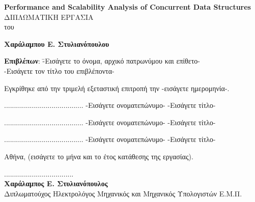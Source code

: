 \documentclass[12pt, twoside, a4paper]{report}
\begin{document}
\begin{center}
\vspace{8ex}
\large \textbf{\textlatin{Performance and Scalability Analysis of Concurrent Data Structures}} \\
\vspace{10ex}
\large
ΔΙΠΛΩΜΑΤΙΚΗ ΕΡΓΑΣΙΑ \\
\vspace{2ex}
\normalsize
του \\
\vspace{2ex}
\parbox[c]{0.4\textwidth} { \center\textbf{
Χαράλαμπου Ε. Στυλιανόπουλου }}
\vspace{10ex}
\flushleft
\begin{tabbing}
\textbf{Επιβλέπων}: \= -Εισάγετε το όνομα, αρχικό πατρωνύμου
			και επίθετο- \\
		    \> -Εισάγετε τον τίτλο του επιβλέποντα-
\end{tabbing}
\end{center}

\noindent
Εγκρίθηκε από την τριμελή εξεταστική επιτροπή την -εισάγετε ημερομηνία-.

\begin{center}
\scriptsize
\parbox[b]{0.3\textwidth} {\center
	........................................
	-Εισάγετε ονοματεπώνυμο-
	-Εισάγετε τίτλο-
}
\parbox[b]{0.3\textwidth} {\center
	........................................
	-Εισάγετε ονοματεπώνυμο-
	-Εισάγετε τίτλο-
}
\parbox[b]{0.3\textwidth} {\center
	........................................
	-Εισάγετε ονοματεπώνυμο-
	-Εισάγετε τίτλο-
}
\end{center}
\vspace{10ex}
\normalsize
\noindent
Αθήνα, (εισάγετε το μήνα και το έτος κατάθεσης της εργασίας).
\newpage
\hspace{10pt}

\vspace{30ex}
\noindent
................................... \\
\textbf{Χαράλαμπος Ε. Στυλιανόπουλος} \\
Διπλωματούχος Ηλεκτρολόγος Μηχανικός και Μηχανικός Υπολογιστών Ε.Μ.Π. \\
\vspace{8ex}

%
%
\newpage


\tableofcontents
\listoffigures
\lstlistoflistings
\end{document}
